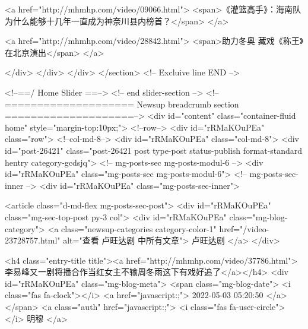                             <a href="http://mhmhp.com/video/09066.html">
                                <span>《灌篮高手》：海南队为什么能够十几年一直成为神奈川县内榜首？</span>
                            </a>
                          
                            <a href="http://mhmhp.com/video/28842.html">
                                <span>助力冬奥 藏戏《称王》在北京演出</span>
                            </a>
                          
                        </div>
                    </div>
                </div>
            </section>
            <!-- Excluive line END -->
             
            <!--==/ Home Slider ==-->
            <!-- end slider-section -->
            <!--==================== Newsup breadcrumb section ====================-->
            <div id="content" class="container-fluid home" style="margin-top:10px;">
                <!--row-->
                <div id="rRMaKOuPEa"  class="row">
                    <!--col-md-8-->
                    <div id="rRMaKOuPEa"  class="col-md-8">
                        <div id="post-26421" class="post-26421 post type-post status-publish format-standard hentry category-gcdsjq">
                            <!-- mg-posts-sec mg-posts-modul-6 -->
                            <div id="rRMaKOuPEa"  class="mg-posts-sec mg-posts-modul-6">
                                <!-- mg-posts-sec-inner -->
                                <div id="rRMaKOuPEa"  class="mg-posts-sec-inner">
                                    
                                    <article class="d-md-flex mg-posts-sec-post">
                                        <div id="rRMaKOuPEa"  class="mg-sec-top-post py-3 col">
                                            <div id="rRMaKOuPEa"  class="mg-blog-category">
                                                <a class="newsup-categories category-color-1" href="/video-23728757.html" alt="查看 卢旺达剧 中所有文章">
                                                    卢旺达剧
                                                </a>
                                            </div>

                                            <h4 class="entry-title title"><a href="http://mhmhp.com/video/37786.html">李易峰又一剧将播合作当红女主不输周冬雨这下有戏好追了</a></h4>
                                            <div id="rRMaKOuPEa"  class="mg-blog-meta">
                                                <span class="mg-blog-date">
                                                    <i class="fas fa-clock"></i>
                                                    <a href="javascript:;">
                                                        2022-05-03 05:20:50
                                                    </a>
                                                </span>
                                                <a class="auth" href="javascript:;">
                                                    <i class="fas fa-user-circle"></i>
                                                    明穆
                                                </a>


